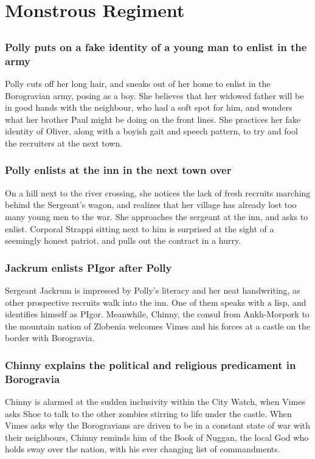 \section{Monstrous Regiment}


\subsection{}
\subsubsection{\Gls{Polly} puts on a fake identity of a young man to enlist in the army}
\Gls{Polly} cuts off her long hair, and sneaks out of her home to enlist in the Borogravian army,
posing as a boy. She believes that her widowed father will be in good hands with the neighbour, who
had a soft spot for him, and wonders what her brother \Gls{Paul} might be doing on the front lines.
She practices her fake identity of \Gls{Oliver}, along with a boyish gait and speech pattern, to
try and fool the recruiters at the next town.

\subsubsection{\Gls{Polly} enlists at the inn in the next town over}
On a hill next to the river crossing, she notices the lack of fresh recruits marching behind the
Sergeant's wagon, and realizes that her village has already lost too many young men to the war. She
approaches the sergeant at the inn, and asks to enlist. Corporal \Gls{Strappi} sitting next to him
is surprised at the sight of a seemingly honest patriot, and pulls out the contract in a hurry.

\subsubsection{\Gls{Jackrum} enlists \Gls{PIgor} after \Gls{Polly}}
Sergeant \Gls{Jackrum} is impressed by \Gls{Polly}'s literacy and her neat handwriting, as other
prospective recruits walk into the inn. One of them speaks with a lisp, and identifies himself as
\Gls{PIgor}. Meanwhile, \Gls{Chinny}, the consul from Ankh-Morpork to the mountain nation of
Zlobenia welcomes \Gls{Vimes} and his forces at a castle on the border with Borogravia.

\subsubsection{\Gls{Chinny} explains the political and religious predicament in Borogravia}
\Gls{Chinny} is alarmed at the sudden inclusivity within the City Watch, when \Gls{Vimes} asks
\Gls{Shoe} to talk to the other zombies stirring to life under the castle. When \Gls{Vimes} asks
why the Borogravians are driven to be in a constant state of war with their neighbours, \Gls{Chinny}
reminds him of the Book of \Gls{Nuggan}, the local God who holds sway over the nation, with his
ever changing list of commandments.

